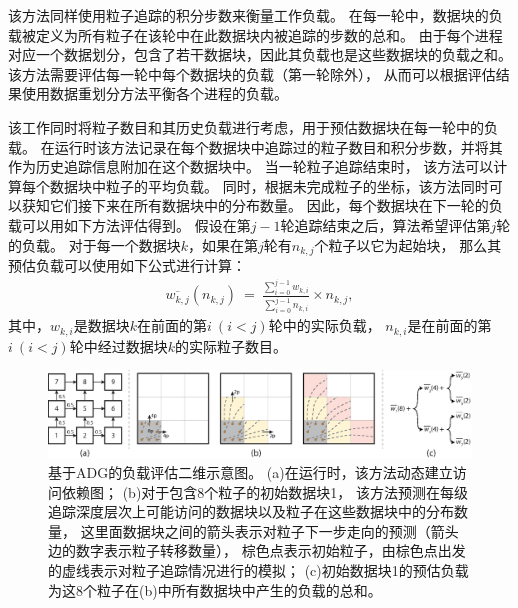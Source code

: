 该方法同样使用粒子追踪的积分步数来衡量工作负载。
在每一轮中，数据块的负载被定义为所有粒子在该轮中在此数据块内被追踪的步数的总和。
由于每个进程对应一个数据划分，包含了若干数据块，因此其负载也是这些数据块的负载之和。
该方法需要评估每一轮中每个数据块的负载（第一轮除外），
从而可以根据评估结果使用数据重划分方法平衡各个进程的负载。

该工作同时将粒子数目和其历史负载进行考虑，用于预估数据块在每一轮中的负载。
在运行时该方法记录在每个数据块中追踪过的粒子数目和积分步数，并将其作为历史追踪信息附加在这个数据块中。
当一轮粒子追踪结束时，
该方法可以计算每个数据块中粒子的平均负载。
同时，根据未完成粒子的坐标，该方法同时可以获知它们接下来在所有数据块中的分布数量。
因此，每个数据块在下一轮的负载可以用如下方法评估得到。
假设在第$j-1$轮追踪结束之后，算法希望评估第$j$轮的负载。
对于每一个数据块$k$，如果在第$j$轮有$n_{k,j}$个粒子以它为起始块，
那么其预估负载可以使用如下公式进行计算：
\begin{equation}
\label{equ:dynamicdr:estimate}
\begin{aligned}
\overline{w_{k,j}}(n_{k,j})\ =\ \frac{\sum\nolimits_{i=0}^{j-1}w_{k,i}}{\sum\nolimits_{i=0}^{j-1}n_{k,i}} \times n_{k,j},
\end{aligned}
\end{equation}
其中，$w_{k,i}$是数据块$k$在前面的第$i\ (i<j)$轮中的实际负载，
$n_{k,i}$是在前面的第$i\ (i<j)$轮中经过数据块$k$的实际粒子数目。

\begin{figure}[!tb]
  \centering
  \includegraphics[width=\linewidth]{image/loadbalance/estimate.eps}
  \caption{
    基于ADG的负载评估二维示意图\parencite{ZhangGYP18}。
    (a)在运行时，该方法动态建立访问依赖图；
    (b)对于包含8个粒子的初始数据块1，
    该方法预测在每级追踪深度层次上可能访问的数据块以及粒子在这些数据块中的分布数量，
    这里面数据块之间的箭头表示对粒子下一步走向的预测（箭头边的数字表示粒子转移数量），
    棕色点表示初始粒子，由棕色点出发的虚线表示对粒子追踪情况进行的模拟；
    (c)初始数据块1的预估负载为这8个粒子在(b)中所有数据块中产生的负载的总和。
  }
  \label{fig:dynamicdr:estimate}
\end{figure}

